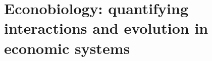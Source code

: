 %
\chapter{Econobiology: quantifying interactions and evolution in economic systems}
\label{sec:econobiology}

